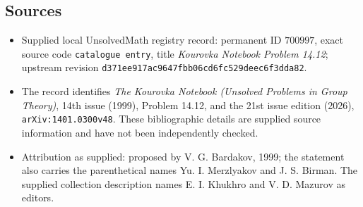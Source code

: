 \documentclass[11pt]{article}
\begin{document}
\subsection{Sources}
\begin{itemize}
\item Supplied local UnsolvedMath registry record: permanent ID \(700997\), exact source code \texttt{catalogue entry}, title \emph{Kourovka Notebook Problem 14.12}; upstream revision \texttt{d371ee917ac9647fbb06cd6fc529deec6f3dda82}.
\item The record identifies \emph{The Kourovka Notebook (Unsolved Problems in Group Theory)}, 14th issue (1999), Problem 14.12, and the 21st issue edition (2026), \texttt{arXiv:1401.0300v48}. These bibliographic details are supplied source information and have not been independently checked.
\item Attribution as supplied: proposed by V. G. Bardakov, 1999; the statement also carries the parenthetical names Yu. I. Merzlyakov and J. S. Birman. The supplied collection description names E. I. Khukhro and V. D. Mazurov as editors.
\end{itemize}
\end{document}
